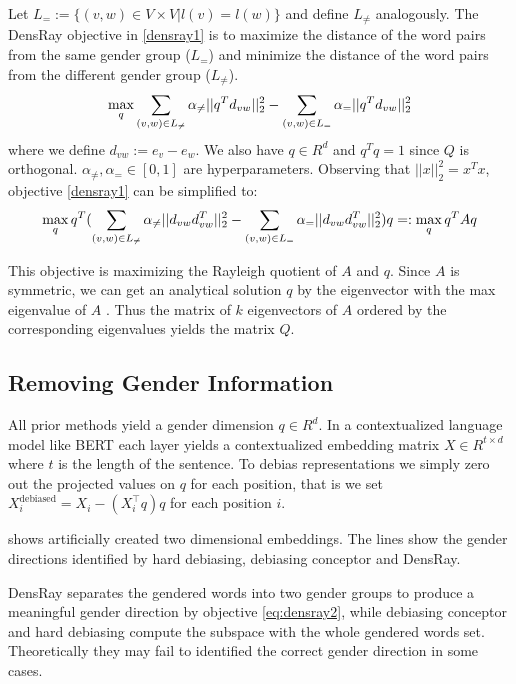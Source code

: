 Let $L_{=}:=\{(v,w)\in V\times V|l(v)=l(w)\}$ and define
$L_{\neq}$ analogously.  The DensRay objective
in \eqref{densray1} is to maximize the distance of the word
pairs from the same gender group ($L_{=}$) and minimize the
distance of the word pairs from the different gender group
($L_{\neq}$).
\begin{eqnarray}
\max\limits_{q} 
\sum_{(v,w)\in L_{\neq}}\alpha_{\neq}||q^Td_{vw}||^2_2
-\sum_{(v,w)\in L_{=}}\alpha_{=}||q^Td_{vw}||^2_2
\eqlabel{densray1}
\end{eqnarray}
where we define $d_{vw}:=e_v-e_w$. We also have $q\in R^d$
and $q^Tq=1$ since $Q$ is orthogonal. $\alpha_{\neq},\alpha_{=}\in [0,1]$ are hyperparameters. Observing that $||x||^2_2=x^Tx$, objective \eqref{densray1} can be simplified to:
\begin{eqnarray}
\max \limits_{q} q^T(
\sum_{(v,w)\in L_{\neq}}\alpha_{\neq}||d_{vw}d_{vw}^T||^2_2-\sum_{(v,w)\in L_{=}}\alpha_{=}||d_{vw}d_{vw}^T||^2_2)q=:\max\limits_{q} q^TAq
\eqlabel{eq:densray2}
\end{eqnarray}

This objective is maximizing the Rayleigh quotient of $A$ and $q$. Since $A$ is symmetric, we can get an analytical solution $q$ by the eigenvector with the max eigenvalue of $A$ . Thus the matrix of $k$ eigenvectors of $A$ ordered by the corresponding eigenvalues yields the matrix $Q$.
\subsection{Removing Gender Information}

All prior methods yield a gender dimension $q \in R^d$. In a contextualized language model like BERT each layer yields a contextualized embedding matrix $X \in R^{t \times d}$ where $t$ is the length of the sentence. To debias representations we simply zero out the projected values on $q$ for each position, that is we set $X^{\text{debiased}}_i = X_i -  (X_i^\intercal q) q$ for each position $i$.

  shows artificially created two dimensional embeddings. The lines show the gender directions identified by hard debiasing, debiasing conceptor and DensRay. 

DensRay separates the gendered words into two gender groups to produce a meaningful gender direction by objective \eqref{eq:densray2}, while debiasing conceptor and hard debiasing compute the subspace with the whole gendered words set. Theoretically they may fail to identified the correct gender direction in some cases. 



